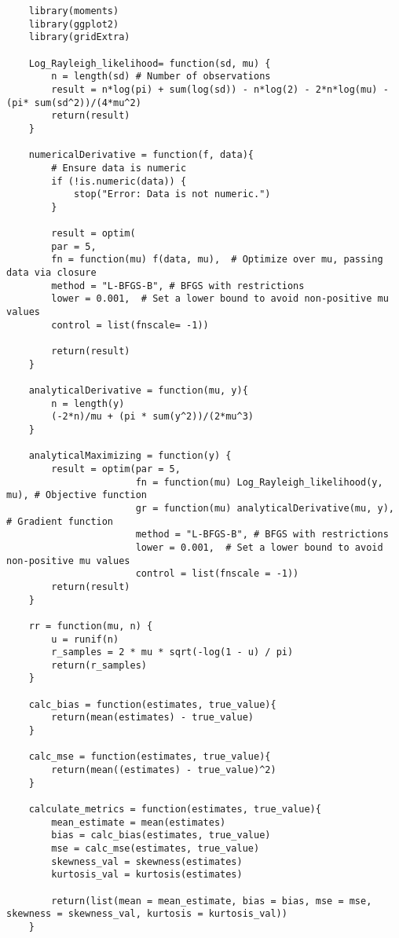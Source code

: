 \begin{verbatim}
    library(moments)
    library(ggplot2)
    library(gridExtra)

    Log_Rayleigh_likelihood= function(sd, mu) {
        n = length(sd) # Number of observations
        result = n*log(pi) + sum(log(sd)) - n*log(2) - 2*n*log(mu) - (pi* sum(sd^2))/(4*mu^2) 
        return(result)
    }

    numericalDerivative = function(f, data){
        # Ensure data is numeric
        if (!is.numeric(data)) {
            stop("Error: Data is not numeric.")
        }

        result = optim(
        par = 5,
        fn = function(mu) f(data, mu),  # Optimize over mu, passing data via closure 
        method = "L-BFGS-B", # BFGS with restrictions
        lower = 0.001,  # Set a lower bound to avoid non-positive mu values
        control = list(fnscale= -1))

        return(result)
    }

    analyticalDerivative = function(mu, y){
        n = length(y)
        (-2*n)/mu + (pi * sum(y^2))/(2*mu^3)
    }

    analyticalMaximizing = function(y) {
        result = optim(par = 5, 
                       fn = function(mu) Log_Rayleigh_likelihood(y, mu), # Objective function
                       gr = function(mu) analyticalDerivative(mu, y),    # Gradient function
                       method = "L-BFGS-B", # BFGS with restrictions
                       lower = 0.001,  # Set a lower bound to avoid non-positive mu values
                       control = list(fnscale = -1))
        return(result)
    }

    rr = function(mu, n) {
        u = runif(n)
        r_samples = 2 * mu * sqrt(-log(1 - u) / pi)
        return(r_samples)
    }

    calc_bias = function(estimates, true_value){
        return(mean(estimates) - true_value)
    }

    calc_mse = function(estimates, true_value){
        return(mean((estimates) - true_value)^2)
    }

    calculate_metrics = function(estimates, true_value){
        mean_estimate = mean(estimates)
        bias = calc_bias(estimates, true_value)
        mse = calc_mse(estimates, true_value)
        skewness_val = skewness(estimates)
        kurtosis_val = kurtosis(estimates) 

        return(list(mean = mean_estimate, bias = bias, mse = mse, skewness = skewness_val, kurtosis = kurtosis_val))
    }


\end{verbatim}
